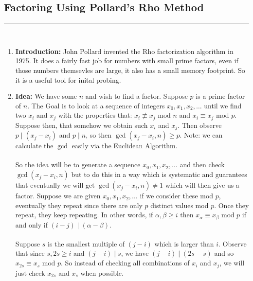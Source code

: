 \documentclass[class=article, crop=false]{standalone}
\begin{document}
\subsection{Factoring Using Pollard's Rho Method}
\rule{\textwidth}{1pt}\\
\begin{enumerate}
	\item \textbf{Introduction:} John Pollard invented the Rho factorization algorithm in
	1975. It does a fairly fast job for numbers with small prime factors, even if those numbers
	themsevles are large, it also has a small memory footprint. So it is a useful tool for
	inital probing.

	\item \textbf{Idea:} We have some $n$ and wish to find a factor.
	Suppose $p$ is a prime factor of $n$. The Goal is to look at a sequence of integers
	$x_0,x_1,x_2,\ldots$ until we find two $x_i$ and $x_j$ with the properties that:
	$x_i\not\equiv x_j\mbox{ mod }n$ and $x_i\equiv x_j\mbox{ mod }p$.
	Suppose then, that somehow we obtain such $x_i$ and $x_j$.
	Then observe $p\mid (x_j-x_i)$ and $p\mid n$,
	so then $\gcd(x_j-x_i,n)\geq p$. Note: we can calculate the $\gcd$ easily
	via the Euclidean Algorithm. \\\\
	So the idea will be to generate a sequence $x_0,x_1,x_2,\dots$
	and then check $\gcd(x_j-x_i,n)$ but to do this in a way which is systematic
	and guarantees that eventually we will get $\gcd(x_j-x_i,n)\neq 1$
	which will then give us a factor. Suppose we are given
	$x_0,x_1,x_2,\ldots$ if we consider these mod $p$,
	eventually they repeat since there are only $p$ distinct values mod $p$.
	Once they repeat, they keep repeating. In other words,
	if $\alpha,\beta\geq i$ then $x_{\alpha}\equiv x_{\beta}\mbox{ mod }p$ if and only if
	$(i-j)\mid(\alpha-\beta)$. \\\\
	Suppose $s$ is the smallest multiple of $(j-i)$ which is larger than $i$.
	Observe that since $s,2s\geq i$ and $(j-i)\mid s$, we have $(j-i)\mid(2s-s)$ and so
	$x_{2s}\equiv x_s \mbox{ mod }p$.
	So instead of checking all combinations of $x_i$ and $x_j$, we will just check $x_{2s}$
	and $x_s$ when possible.


\end{enumerate}
\end{document}
